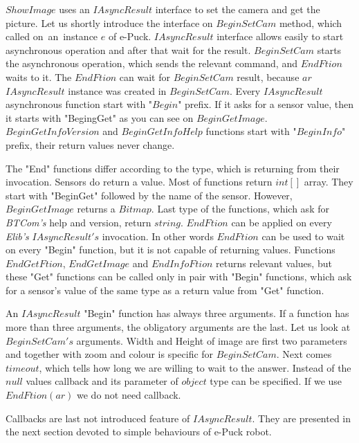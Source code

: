   $ShowImage$ uses an $IAsyncResult$ interface to set the camera and get the picture.
  Let us shortly introduce the interface on $BeginSetCam$ method, which called 
  on~an~instance $e$ of e-Puck.
  $IAsyncResult$ interface allows easily to start asynchronous operation and after 
  that wait for the result.
  $BeginSetCam$ starts the asynchronous operation, which sends the relevant command, and $EndFtion$ waits to it.
  The $EndFtion$ can wait for $BeginSetCam$ result, because $ar$ $IAsyncResult$ instance was created in $BeginSetCam$.
  Every $IAsyncResult$ asynchronous function start with "$Begin$" prefix. 
  If it asks for a sensor value, then it starts with "BegingGet" as you can see on $BeginGetImage$.
  $BeginGetInfoVersion$ and $BeginGetInfoHelp$ functions start with "$BeginInfo$" prefix, their return values never change. 

  The "End" functions differ according to the type, which is returning from their invocation.
  Sensors do return a value. Most of functions return $int[]$ array. They start with "BeginGet" 
  followed by the name of the sensor.
  However,$BeginGetImage$ returns a $Bitmap$. Last type of the functions,
  which ask for {\it BTCom's} help and version, return $string$.
  $EndFtion$ can be applied on every {\it Elib's} $IAsyncResult's$ invocation. 
  In other words $EndFtion$ can be used to wait on every "Begin" function, but
  it is not capable of returning values. Functions $EndGetFtion$, $EndGetImage$ and $EndInfoFtion$ returns relevant values, but
  these "Get" functions can be called only in pair with "Begin" functions, which ask for a sensor's value 
  of the same type as a return value from "Get" function.

  An $IAsyncResult$ "Begin" function has always three arguments. If a function has more than three arguments, the obligatory arguments are the last.
  Let us look at $BeginSetCam's$ arguments. Width and Height of image are first two parameters 
  and together with zoom and colour is specific for $BeginSetCam$.
  Next comes $timeout$, which tells how long we are willing to wait to the answer. 
  Instead of the $null$ values callback and its parameter of $object$ type can be specified.
  If we use $EndFtion(ar)$ we do not need callback.

  Callbacks are last not introduced feature of $IAsyncResult$. 
  They are presented in the next section devoted to simple behaviours of e-Puck robot.
